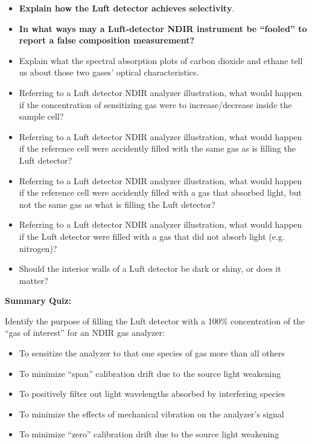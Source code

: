 \begin{itemize}
\item{} {\bf Explain how the Luft detector achieves selectivity}.
\item{} {\bf In what ways may a Luft-detector NDIR instrument be ``fooled'' to report a false composition measurement?}
\item{} Explain what the spectral absorption plots of carbon dioxide and ethane tell us about those two gases' optical characteristics.
\item{} Referring to a Luft detector NDIR analyzer illustration, what would happen if the concentration of sensitizing gas were to increase/decrease inside the sample cell?
\item{} Referring to a Luft detector NDIR analyzer illustration, what would happen if the reference cell were accidently filled with the same gas as is filling the Luft detector?
\item{} Referring to a Luft detector NDIR analyzer illustration, what would happen if the reference cell were accidently filled with a gas that absorbed light, but not the same gas as what is filling the Luft detector?
\item{} Referring to a Luft detector NDIR analyzer illustration, what would happen if the Luft detector were filled with a gas that did not absorb light (e.g. nitrogen)?
\item{} Should the interior walls of a Luft detector be dark or shiny, or does it matter?
\end{itemize}







\vfil \eject

\noindent
{\bf Summary Quiz:}

Identify the purpose of filling the Luft detector with a 100\% concentration of the ``gas of interest'' for an NDIR gas analyzer:

\begin{itemize}
\item{} To sensitize the analyzer to that one species of gas more than all others
\vskip 5pt
\item{} To minimize ``span'' calibration drift due to the source light weakening
\vskip 5pt
\item{} To positively filter out light wavelengths absorbed by interfering species
\vskip 5pt
\item{} To minimize the effects of mechanical vibration on the analyzer's signal
\vskip 5pt
\item{} To minimize ``zero'' calibration drift due to the source light weakening
\end{itemize}





